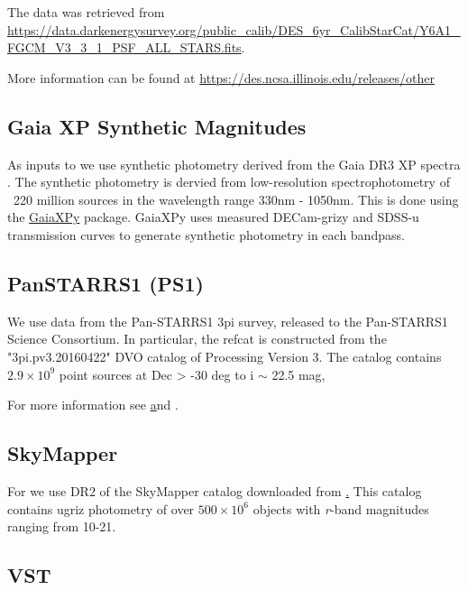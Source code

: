 The data was retrieved from \url{https://data.darkenergysurvey.org/public_calib/DES_6yr_CalibStarCat/Y6A1_FGCM_V3_3_1_PSF_ALL_STARS.fits}.

More information can be found at \url{https://des.ncsa.illinois.edu/releases/other}


\subsection{Gaia XP Synthetic Magnitudes}
\label{sec:gaiaxp}
As inputs to \monster we use synthetic photometry derived from the Gaia DR3 XP spectra \citep{GaiaCollaboration:2023}. 
The synthetic photometry is dervied from low-resolution spectrophotometry of ~220 million sources in the wavelength range 330nm - 1050nm. 
This is done using the \href{https://github.com/gaia-dpci/GaiaXPy/cd}{GaiaXPy} package. 
GaiaXPy uses measured DECam-grizy and SDSS-u transmission curves to generate synthetic photometry in each bandpass. 


\subsection{PanSTARRS1 (PS1)}
\label{sec:ps1}

We use data from the Pan-STARRS1 3pi survey, released to the Pan-STARRS1 Science Consortium.
In particular, the refcat is constructed from the "3pi.pv3.20160422" DVO catalog of Processing Version 3.
The catalog contains $2.9 \times 10^9$ point sources at Dec > -30 deg to i $\sim$ 22.5 mag,

For more information see \href{http://panstarrs.stsci.edu} and \citet{Chambers:2016}.

\subsection{SkyMapper}
\label{sec:skymapper}
For \monster we use DR2 of the SkyMapper catalog \citep{Onken:2019} downloaded from \href{https://skymapper.anu.edu.au/_data/DR2/}. 
This catalog contains ugriz photometry of over $500 \times 10^6$ objects with \textit{r}-band magnitudes ranging from 10-21. 

\subsection{VST}
\label{sec:vst}

